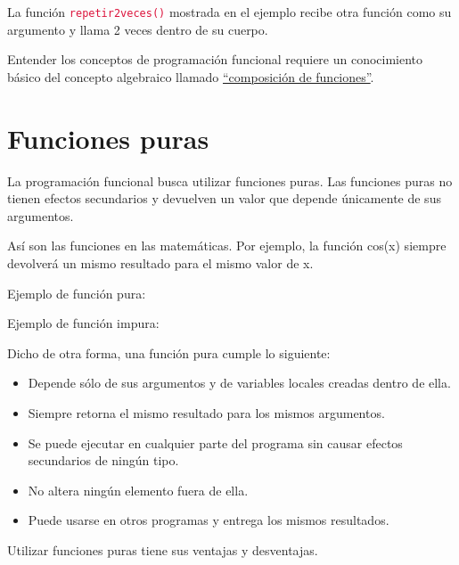 \documentclass{report}
\newcommand{\doble}[1]{``#1''}
\newcommand{\link}[2]{\href{#1}{\underline{#2}}}
\newcommand{\ttt}[1]{
  \textcolor{Crimson}{\texttt{#1}}
}
\begin{document}

La función \ttt{repetir2veces()} mostrada en el ejemplo recibe otra función como su argumento y llama 2 veces dentro de su cuerpo.\smallskip

Entender los conceptos de programación funcional requiere un conocimiento básico del concepto algebraico llamado \link{https://www.mathsisfun.com/sets/functions-composition.html}{\doble{composición de funciones}}.

\section{Funciones puras}

La programación funcional busca utilizar funciones puras. Las funciones puras no tienen efectos secundarios y devuelven un valor que depende únicamente de sus argumentos.\smallskip

Así son las funciones en las matemáticas. Por ejemplo, la función cos(x) siempre devolverá un mismo resultado para el mismo valor de x.

Ejemplo de función pura:


Ejemplo de función impura:


Dicho de otra forma, una función pura cumple lo siguiente:

\begin{itemize}
  \item Depende sólo de sus argumentos y de variables locales creadas dentro de ella.
  
  \item Siempre retorna el mismo resultado para los mismos argumentos.

  \item Se puede ejecutar en cualquier parte del programa sin causar efectos secundarios de ningún tipo.
  
  \item No altera ningún elemento fuera de ella.
  
  \item Puede usarse en otros programas y entrega los mismos resultados.
  
\end{itemize}

Utilizar funciones puras tiene sus ventajas y desventajas.
\end{document}

